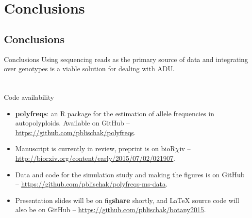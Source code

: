\documentclass[presentation]{beamer}
\begin{document}
\section{Conclusions}

\subsection*{Conclusions}

\begin{frame}[t]{Conclusions}
	Using sequencing reads as the primary source of data and integrating over genotypes is a viable solution for dealing with ADU.
	\vspace{0.1in}
\end{frame}

\section*{}

\begin{frame}[t,plain]{Code availability}
	\fontsize{10pt}{10}\selectfont
	\begin{itemize}
		\item \textbf{polyfreqs}: an R package for the estimation of allele frequencies in autopolyploids. Available on GitHub -- \url{https://github.com/pblischak/polyfreqs}.
		\vspace{0.2in}
		
		\item Manuscript is currently in review, preprint is on bioR$\chi$iv -- \url{http://biorxiv.org/content/early/2015/07/02/021907}.
		\vspace{0.2in}
	
		\item Data and code for the simulation study and making the figures is on GitHub -- \url{https://github.com/pblischak/polyfreqs-ms-data}.
		\vspace{0.2in}
	
		\item Presentation slides will be on fig\textbf{share} shortly, and \LaTeX{} source code will also be on GitHub -- \url{https://github.com/pblischak/botany2015}.
	\end{itemize}
\end{frame}
\end{document}
